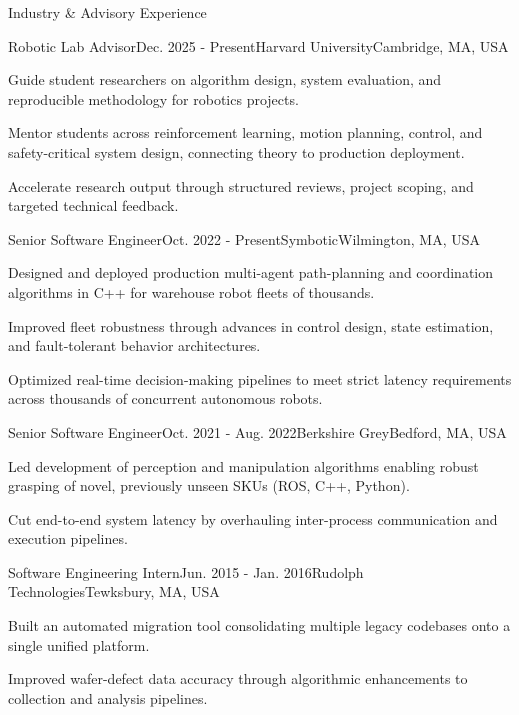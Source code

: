 \documentclass{resume} %
\begin{document}
\begin{rSection}{Industry \& Advisory Experience}

\begin{rSubsection}{Robotic Lab Advisor}{Dec. 2025 - Present}{Harvard University}{Cambridge, MA, USA}
\item Guide student researchers on algorithm design, system evaluation, and reproducible methodology for robotics projects.
\item Mentor students across reinforcement learning, motion planning, control, and safety-critical system design, connecting theory to production deployment.
\item Accelerate research output through structured reviews, project scoping, and targeted technical feedback.
\end{rSubsection}

\begin{rSubsection}{Senior Software Engineer}{Oct. 2022 - Present}{Symbotic}{Wilmington, MA, USA}
\item Designed and deployed production multi-agent path-planning and coordination algorithms in C++ for warehouse robot fleets of thousands.
\item Improved fleet robustness through advances in control design, state estimation, and fault-tolerant behavior architectures.
\item Optimized real-time decision-making pipelines to meet strict latency requirements across thousands of concurrent autonomous robots.
\end{rSubsection}

\begin{rSubsection}{Senior Software Engineer}{Oct. 2021 - Aug. 2022}{Berkshire Grey}{Bedford, MA, USA}
\item Led development of perception and manipulation algorithms enabling robust grasping of novel, previously unseen SKUs (ROS, C++, Python).
\item Cut end-to-end system latency by overhauling inter-process communication and execution pipelines.
\end{rSubsection}

\begin{rSubsection}{Software Engineering Intern}{Jun. 2015 - Jan. 2016}{Rudolph Technologies}{Tewksbury, MA, USA}
\item Built an automated migration tool consolidating multiple legacy codebases onto a single unified platform.
\item Improved wafer-defect data accuracy through algorithmic enhancements to collection and analysis pipelines.
\end{rSubsection}


\end{rSection}
\end{document}

